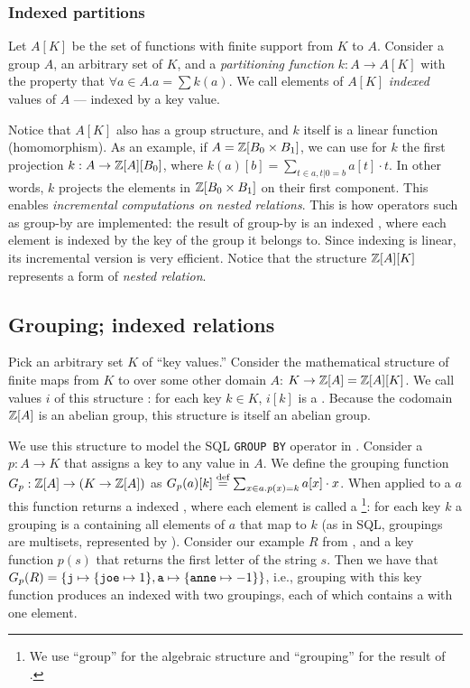\subsubsection{Indexed partitions}

Let $A[K]$ be the set of functions with finite support from $K$ to $A$.
Consider a group $A$, an arbitrary set of  $K$, and a 
\emph{partitioning function} $k: A \to A[K]$ with the property that 
$\forall a \in A . a = \sum k(a)$.  We call elements of $A[K]$ \emph{indexed}
values of $A$ --- indexed by a key value.

Notice that $A[K]$ also has a group structure, and $k$ itself 
is a linear function (homomorphism).  As an example,
if $A = \mathbb{Z}[B_0 \times B_1]$, we can use for $k$ the first projection
$k: A \to \mathbb{Z}[A][B_0]$, where $k(a)[b] = \sum_{t \in a, t|0 = b} a[t] \cdot t$.
In other words, $k$ projects the elements in $\mathbb{Z}[B_0 \times B_1]$ on 
their first component.  This enables \emph{incremental computations
on nested relations}.  This is how operators such as group-by are
implemented: the result of group-by is an indexed \zr, where each 
element is indexed by the key of the group it belongs to.  Since
indexing is linear, its incremental version is very efficient.
Notice that the structure $\mathbb{Z}[A][K]$ represents a form of \emph{nested relation}.

\subsection{Grouping; indexed relations}\label{sec:grouping}

Pick an arbitrary set $K$ of ``key values.''
Consider the mathematical structure of finite maps from $K$ 
to \zrs over some other domain $A$: $K \to \mathbb{Z}[A] = \mathbb{Z}[A][K]$.
We call values $i$ of this structure : for
each key $k \in K$, $i[k]$ is a \zr.  Because 
the codomain $\mathbb{Z}[A]$ is an abelian group, this structure is itself 
an abelian group.

We use this structure to model the SQL \texttt{GROUP BY} operator in \dbsp.  
Consider a 
$p: A \to K$ that assigns a key to any value in $A$.  We define the grouping function
$G_p: \mathbb{Z}[A] \to (K \to \mathbb{Z}[A])$ as $G_p(a)[k] \stackrel{\textrm{\scriptsize def}}{=} \sum_{x \in a.p(x)=k}a[x] \cdot x$.
When applied to a \zr $a$ this function returns a indexed \zr, where each element 
is called a \footnote{We use
``group'' for the algebraic structure and ``grouping'' for the result of .}: for each key $k$ a 
grouping is a \zr containing all elements of $a$ that map to $k$ 
(as in SQL, groupings are multisets, represented by \zrs).
Consider our example \zr $R$ from ,
and a key function $p(s)$ that returns the first letter of the string 
$s$. Then we have that $G_p(R) = \{ \mbox{\texttt{j}} \mapsto \{ \mbox{\texttt{joe}} 
\mapsto 1 \}, \mbox{\texttt{a}} \mapsto \{ \mbox{\texttt{anne}} \mapsto -1 \} \}$,
i.e., grouping with this key function produces an indexed \zr with two groupings, each 
of which contains a \zr with one element.

